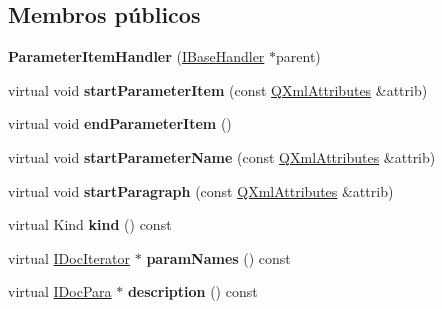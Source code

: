 \subsection*{Membros públicos}
\begin{DoxyCompactItemize}
\item 
\hypertarget{class_parameter_item_handler_a29510597e3cf2a9abb3d91f87a19ac2a}{{\bfseries Parameter\-Item\-Handler} (\hyperlink{class_i_base_handler}{I\-Base\-Handler} $\ast$parent)}\label{class_parameter_item_handler_a29510597e3cf2a9abb3d91f87a19ac2a}

\item 
\hypertarget{class_parameter_item_handler_aaf528a3aec91fda513c2d4c47b390e5a}{virtual void {\bfseries start\-Parameter\-Item} (const \hyperlink{class_q_xml_attributes}{Q\-Xml\-Attributes} \&attrib)}\label{class_parameter_item_handler_aaf528a3aec91fda513c2d4c47b390e5a}

\item 
\hypertarget{class_parameter_item_handler_a741a364eb21a6522a1e405505a703172}{virtual void {\bfseries end\-Parameter\-Item} ()}\label{class_parameter_item_handler_a741a364eb21a6522a1e405505a703172}

\item 
\hypertarget{class_parameter_item_handler_af5051ae1d2646a6b4a3b35f1687257a8}{virtual void {\bfseries start\-Parameter\-Name} (const \hyperlink{class_q_xml_attributes}{Q\-Xml\-Attributes} \&attrib)}\label{class_parameter_item_handler_af5051ae1d2646a6b4a3b35f1687257a8}

\item 
\hypertarget{class_parameter_item_handler_abb7f955561480002949ada58092c1964}{virtual void {\bfseries start\-Paragraph} (const \hyperlink{class_q_xml_attributes}{Q\-Xml\-Attributes} \&attrib)}\label{class_parameter_item_handler_abb7f955561480002949ada58092c1964}

\item 
\hypertarget{class_parameter_item_handler_af8e62c8a81ddf2283205cc8955de50eb}{virtual Kind {\bfseries kind} () const }\label{class_parameter_item_handler_af8e62c8a81ddf2283205cc8955de50eb}

\item 
\hypertarget{class_parameter_item_handler_a0d4771f7b9c055067b8897e2b3160057}{virtual \hyperlink{class_i_doc_iterator}{I\-Doc\-Iterator} $\ast$ {\bfseries param\-Names} () const }\label{class_parameter_item_handler_a0d4771f7b9c055067b8897e2b3160057}

\item 
\hypertarget{class_parameter_item_handler_a286592464b720cd61400fa22215a35c5}{virtual \hyperlink{class_i_doc_para}{I\-Doc\-Para} $\ast$ {\bfseries description} () const }\label{class_parameter_item_handler_a286592464b720cd61400fa22215a35c5}

\end{DoxyCompactItemize}
